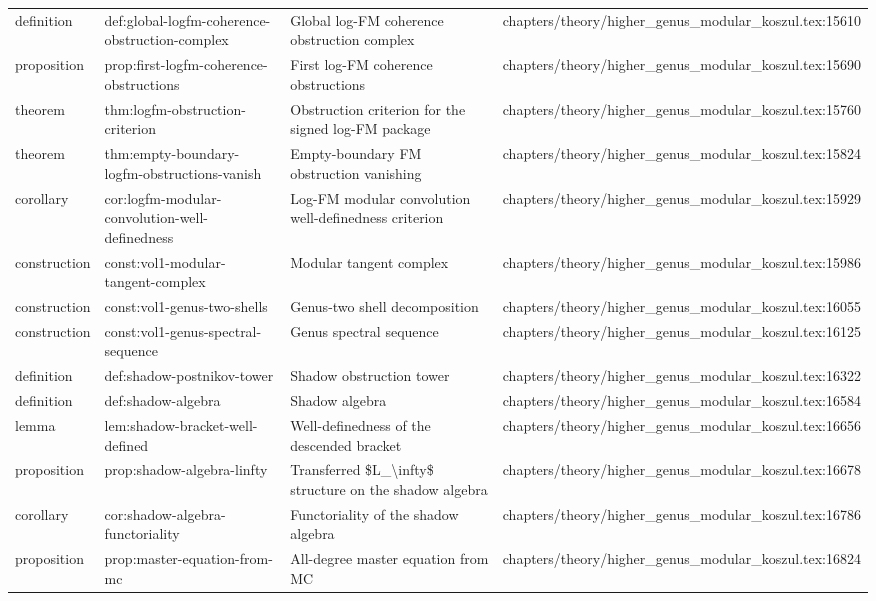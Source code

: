 \documentclass[11pt]{article}
\begin{document}
\begin{longtable}{L{0.10\textwidth}L{0.26\textwidth}L{0.42\textwidth}L{0.22\textwidth}}
definition & def:global-logfm-coherence-obstruction-complex & Global log-FM coherence obstruction complex & chapters/theory/higher\_genus\_modular\_koszul.tex:15610\\
proposition & prop:first-logfm-coherence-obstructions & First log-FM coherence obstructions & chapters/theory/higher\_genus\_modular\_koszul.tex:15690\\
theorem & thm:logfm-obstruction-criterion & Obstruction criterion for the signed log-FM package & chapters/theory/higher\_genus\_modular\_koszul.tex:15760\\
theorem & thm:empty-boundary-logfm-obstructions-vanish & Empty-boundary FM obstruction vanishing & chapters/theory/higher\_genus\_modular\_koszul.tex:15824\\
corollary & cor:logfm-modular-convolution-well-definedness & Log-FM modular convolution well-definedness criterion & chapters/theory/higher\_genus\_modular\_koszul.tex:15929\\
construction & const:vol1-modular-tangent-complex & Modular tangent complex & chapters/theory/higher\_genus\_modular\_koszul.tex:15986\\
construction & const:vol1-genus-two-shells & Genus-two shell decomposition & chapters/theory/higher\_genus\_modular\_koszul.tex:16055\\
construction & const:vol1-genus-spectral-sequence & Genus spectral sequence & chapters/theory/higher\_genus\_modular\_koszul.tex:16125\\
definition & def:shadow-postnikov-tower & Shadow obstruction tower & chapters/theory/higher\_genus\_modular\_koszul.tex:16322\\
definition & def:shadow-algebra & Shadow algebra & chapters/theory/higher\_genus\_modular\_koszul.tex:16584\\
lemma & lem:shadow-bracket-well-defined & Well-definedness of the descended bracket & chapters/theory/higher\_genus\_modular\_koszul.tex:16656\\
proposition & prop:shadow-algebra-linfty & Transferred \$L\_\textbackslash{}infty\$ structure on the shadow algebra & chapters/theory/higher\_genus\_modular\_koszul.tex:16678\\
corollary & cor:shadow-algebra-functoriality & Functoriality of the shadow algebra & chapters/theory/higher\_genus\_modular\_koszul.tex:16786\\
proposition & prop:master-equation-from-mc & All-degree master equation from MC & chapters/theory/higher\_genus\_modular\_koszul.tex:16824\\

\end{longtable}
\end{document}
